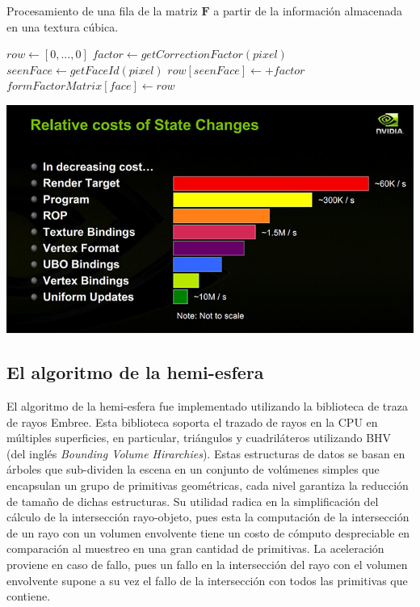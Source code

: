 \begin{algorithm}
\caption{Procesamiento de una fila de la matriz $\mathbf{F}$ a partir de la información almacenada en una textura cúbica.}
\label{alg:processHemicube}
\begin{algorithmic}
			\State $row \gets [0,...,0]$
				\State $factor \gets getCorrectionFactor(pixel)$
				\State $seenFace \gets getFaceId(pixel)$
					\State $row[seenFace] \gets + factor$
				\EndIf
			\EndLoop
			\State $formFactorMatrix[face] \gets  row$
		\EndFunction
\end{algorithmic}
\end{algorithm}

\vspace{5mm}
\begin{minipage}[h]{\linewidth}
	\centering
	\includegraphics[width=\linewidth]{assets/statecosts}
	\label{img:statechangescost}
\end{minipage}

\subsection{El algoritmo de la hemi-esfera}
El algoritmo de la hemi-esfera fue implementado utilizando la biblioteca de traza de rayos Embree. Esta biblioteca soporta el trazado de rayos en la CPU en múltiples superficies, en particular, triángulos y cuadriláteros utilizando BHV (del inglés \textit{Bounding Volume Hirarchies}). Estas estructuras de datos se basan en árboles que sub-dividen la escena en un conjunto de volúmenes simples que encapsulan un grupo de primitivas geométricas, cada nivel garantiza la reducción de tamaño de dichas estructuras. Su utilidad radica en la simplificación del cálculo de la intersección rayo-objeto, pues esta la computación de la intersección de un rayo con un volumen envolvente tiene un costo de cómputo despreciable en comparación al muestreo en una gran cantidad de primitivas. La aceleración proviene en caso de fallo, pues un fallo en la intersección del rayo con el volumen envolvente supone a su vez el fallo de la intersección con todos las primitivas que contiene.

